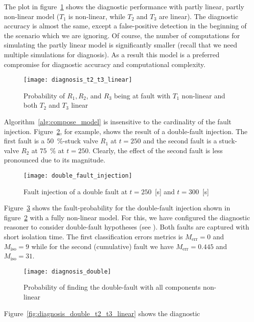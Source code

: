 %
The plot in figure~\ref{fig:diagnosis_t2_t3_linear} shows the
diagnostic performance with partly linear, partly non-linear model
($T_1$ is non-linear, while $T_2$ and $T_3$ are linear). The
diagnostic accuracy is almost the same, except a false-positive
detection in the beginning of the scenario which we are ignoring. Of
course, the number of computations for simulating the partly linear
model is significantly smaller (recall that we need multiple
simulations for diagnosis). As a result this model is a preferred
compromise for diagnostic accuracy and computational complexity.
%
\begin{figure}[htb]
  \centering
  \texttt{[image: diagnosis\_t2\_t3\_linear]}
  \caption{Probability of $R_1, R_2$, and $R_3$ being at fault with $T_1$ non-linear and both $T_2$ and $T_3$ linear}
  \label{fig:diagnosis_t2_t3_linear}
\end{figure}
\par
%
Algorithm~\ref{alg:compose_model} is insensitive to the cardinality of
the fault injection. Figure~\ref{fig:double_fault_injection}, for
example, shows the result of a double-fault injection. The first fault
is a $50$~\%-stuck valve $R_1$ at $t = 250$ and the second fault is a
stuck-valve $R_2$ at $75$~\% at $t = 250$. Clearly, the effect of the
second fault is less pronounced due to its magnitude.
%
\begin{figure}[htb]
  \centering
  \texttt{[image: double\_fault\_injection]}
  \caption{Fault injection of a double fault at $t = 250$~[s] and $t = 300$~[s]}
  \label{fig:double_fault_injection}
\end{figure}
\par
Figure~\ref{fig:diagnosis_double} shows the fault-probability for the
double-fault injection shown in
figure~\ref{fig:double_fault_injection} with a fully non-linear
model. For this, we have configured the diagnostic reasoner to
consider double-fault hypotheses (see \cite{feldman13genius}). Both
faults are captured with short isolation time. The first
classification errors metrics is $M_{\mathrm{err}} = 0$ and
$M_{\mathrm{iso}} = 9$ while for the second (cumulative) fault we have
$M_{\mathrm{err}} = 0.445$ and $M_{\mathrm{iso}} = 31$.
%
\begin{figure}[htb]
  \centering
  \texttt{[image: diagnosis\_double]}
  \caption{Probability of finding the double-fault with all components non-linear}
  \label{fig:diagnosis_double}
\end{figure}
\par
Figure~\ref{fig:diagnosis_double_t2_t3_linear} shows the diagnostic
